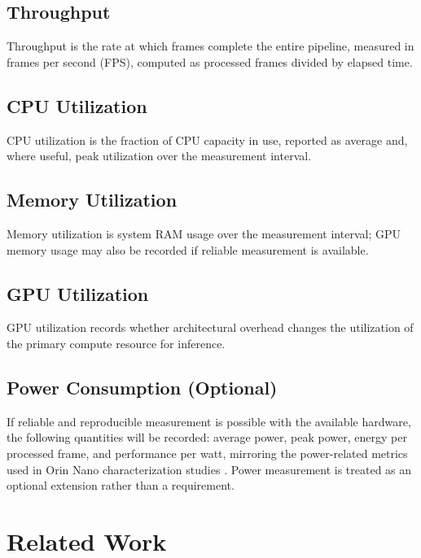 \subsection{Throughput}

Throughput is the rate at which frames complete the entire pipeline,
measured in frames per second (FPS), computed as processed frames divided
by elapsed time.

\subsection{CPU Utilization}

CPU utilization is the fraction of CPU capacity in use, reported as average
and, where useful, peak utilization over the measurement interval.

\subsection{Memory Utilization}

Memory utilization is system RAM usage over the measurement interval; GPU
memory usage may also be recorded if reliable measurement is available.

\subsection{GPU Utilization}

GPU utilization records whether architectural overhead changes the
utilization of the primary compute resource for inference.

\subsection{Power Consumption (Optional)}

If reliable and reproducible measurement is possible with the available
hardware, the following quantities will be recorded: average power, peak
power, energy per processed frame, and performance per watt, mirroring the
power-related metrics used in Orin Nano characterization studies
\cite{zequn2026}. Power measurement is treated as an optional extension
rather than a requirement.

\section{Related Work}
\label{sec:related-work}

